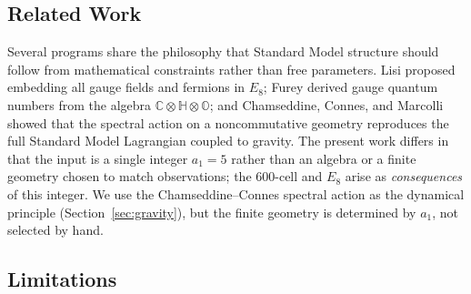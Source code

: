 \documentclass[12pt,a4paper]{article}
\theoremstyle{definition}
\begin{document}
\subsection{Related Work}

Several programs share the philosophy that Standard Model structure should follow from mathematical constraints rather than free parameters. Lisi \cite{lisi2007} proposed embedding all gauge fields and fermions in $E_8$; Furey \cite{furey2016} derived gauge quantum numbers from the algebra $\mathbb{C} \otimes \mathbb{H} \otimes \mathbb{O}$; and Chamseddine, Connes, and Marcolli \cite{ccm2007} showed that the spectral action on a noncommutative geometry reproduces the full Standard Model Lagrangian coupled to gravity. The present work differs in that the input is a single integer $a_1 = 5$ rather than an algebra or a finite geometry chosen to match observations; the 600-cell and $E_8$ arise as \emph{consequences} of this integer. We use the Chamseddine--Connes spectral action as the dynamical principle (Section~\ref{sec:gravity}), but the finite geometry is determined by $a_1$, not selected by hand.

\subsection{Limitations}
\label{sec:limitations}
\end{document}
